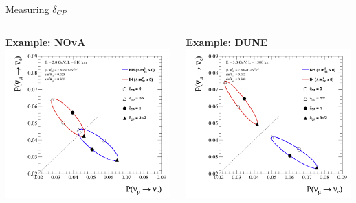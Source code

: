 %
%
\begin{frame}{Measuring $\delta_{CP}$}

\begin{columns}[T]
  \begin{column}{0.50\textwidth}
    \begin{center}
       {\bf Example: NOvA}\\
       \includegraphics[width=0.99\textwidth]{./images/biprob/biprob_nova_matter_maximal}
    \end{center}
  \end{column}
  \begin{column}{0.50\textwidth}
    \begin{center}
       {\bf Example: DUNE}\\
       \includegraphics[width=0.99\textwidth]{./images/biprob/biprob_dune_matter_maximal}
    \end{center}
  {\small
  }
  \end{column}
\end{columns}

\end{frame}

